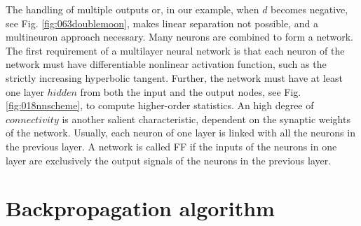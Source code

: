 

The handling of multiple outputs or, in our example, 
when $d$ becomes negative, see Fig. \ref{fig:063doublemoon}, makes linear
separation not possible, and a multineuron approach necessary. 
Many neurons are combined to form a network.
The first requirement of a multilayer neural network
is that each neuron of the network must have differentiable nonlinear activation
function, such as the strictly increasing hyperbolic tangent.
Further, the network must have at least one layer $hidden$ from both the input
and the output nodes, see Fig. \ref{fig:018nnscheme}, to compute higher-order
statistics.
An high degree of $connectivity$ is another salient characteristic, dependent on
the synaptic weights of the network.
Usually, each neuron of one layer is linked with all the neurons in the previous
layer.
A network is called \acs{FF} if the inputs of the neurons in
one layer are exclusively the output signals of the neurons in the previous
layer.\\


\section{Backpropagation algorithm}
\label{sec:backpropagationalgorithm}

